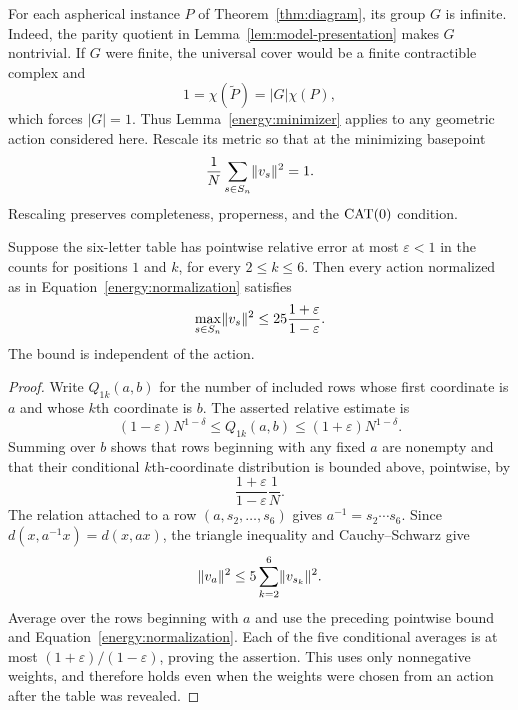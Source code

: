 For each aspherical instance $P$ of Theorem~\ref{thm:diagram}, its group
$G$ is infinite.  Indeed, the parity quotient in Lemma~\ref{lem:model-presentation}
makes $G$ nontrivial.  If $G$ were finite, the universal cover would be a
finite contractible complex and
\[
 1=\chi(\widetilde P)=|G|\chi(P),
\]
which forces $|G|=1$.  Thus Lemma~\ref{energy:minimizer} applies to any
geometric action considered here.  Rescale its metric so that at the
minimizing basepoint
\begin{equation}\label{energy:normalization}
 \frac1N\sum_{s\in S_n}\lVert v_s\rVert^2=1.
\end{equation}
Rescaling preserves completeness, properness, and the $\operatorname{CAT}(0)$
condition.

\begin{lemma}\label{energy:displacement-bound}
Suppose the six-letter table has pointwise relative error at most
$\varepsilon<1$ in the counts for positions $1$ and $k$, for every
$2\le k\le6$.  Then every action normalized as in
Equation~\eqref{energy:normalization} satisfies
\begin{equation}\label{energy:max-displacement}
 \max_{s\in S_n}\lVert v_s\rVert^2
 \le25\frac{1+\varepsilon}{1-\varepsilon}.
\end{equation}
The bound is independent of the action.
\end{lemma}

\begin{proof}
Write $Q_{1k}(a,b)$ for the number of included rows whose first
coordinate is $a$ and whose $k$th coordinate is $b$.  The asserted
relative estimate is
\[
 (1-\varepsilon)N^{1-\delta}
 \le Q_{1k}(a,b)\le
 (1+\varepsilon)N^{1-\delta}.
\]
Summing over $b$ shows that rows beginning with any fixed $a$ are
nonempty and that their conditional $k$th-coordinate distribution is
bounded above, pointwise, by
\[
 \frac{1+\varepsilon}{1-\varepsilon}\frac1N.
\]
The relation attached to a row $(a,s_2,\ldots,s_6)$ gives
$a^{-1}=s_2\cdots s_6$.  Since
$d(x,a^{-1}x)=d(x,ax)$, the triangle inequality and Cauchy--Schwarz give
\[
 \lVert v_a\rVert^2\le5\sum_{k=2}^6\lVert v_{s_k}\rVert^2.
\]
Average over the rows beginning with $a$ and use the preceding
pointwise bound and Equation~\eqref{energy:normalization}.  Each of the
five conditional averages is at most
$(1+\varepsilon)/(1-\varepsilon)$, proving the assertion.  This uses
only nonnegative weights, and therefore holds even when the weights
were chosen from an action after the table was revealed.
\end{proof}

